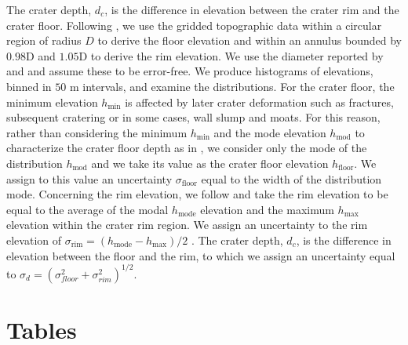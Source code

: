 The crater  depth, $d_c$, is  the difference in elevation  between the
crater rim and the  crater floor.  Following \citet{Kalynn:2013fg}, we
use the  gridded topographic data  within a circular region  of radius
$D$ to  derive the floor  elevation and  within an annulus  bounded by
$0.98$D and $1.05$D to derive the  rim elevation.  We use the diameter
reported by \citet{Head:2010fy}  and \citet{Jozwiak:2012dq} and assume
these to be error-free. We produce histograms of elevations, binned in
$50$  m intervals,  and  examine the  distributions.   For the  crater
floor,  the minimum  elevation $h_{\text{min}}$  is affected  by later
crater deformation such as fractures,  subsequent cratering or in some
cases, wall slump and moats.  For this reason, rather than considering
the minimum  $h_{\text{min}}$ and the mode  elevation $h_{\text{mod}}$
to characterize the crater floor depth as in \citet{Kalynn:2013fg}, we
consider only  the mode  of the  distribution $h_{\text{mod}}$  and we
take its value  as the crater floor  elevation $h_{\text{floor}}$.  We
assign to  this value an uncertainty  $\sigma_{\text{floor}}$ equal to
the width of the distribution  mode.  Concerning the rim elevation, we
follow \citet{Kalynn:2013fg} and take the rim elevation to be equal to
the average of  the modal $h_{\text{mode}}$ elevation  and the maximum
$h_{\text{max}}$ elevation within the crater rim region.  We assign an
uncertainty        to        the        rim        elevation        of
$\sigma_{\text{rim}}=(h_{\text{mode}}-h_{\text{max}})/2$
\citep{Kalynn:2013fg}.  The crater depth,  $d_c$, is the difference in
elevation  between the  floor  and  the rim,  to  which  we assign  an
uncertainty                          equal                          to
$\sigma_{d}=(\sigma_{floor}^2+\sigma_{rim}^2)^{1/2}$.
\clearpage
\section{Tables}
\label{sec:table}

